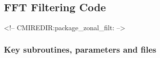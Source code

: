 \subsection{FFT Filtering Code}
\label{sec:zonal_filt}
\begin{rawhtml}
<!-- CMIREDIR:package_zonal_filt: -->
\end{rawhtml}

\subsubsection{Key subroutines, parameters and files}
\label{sec:pkg:zonal_filt:implementation_synopsis}
